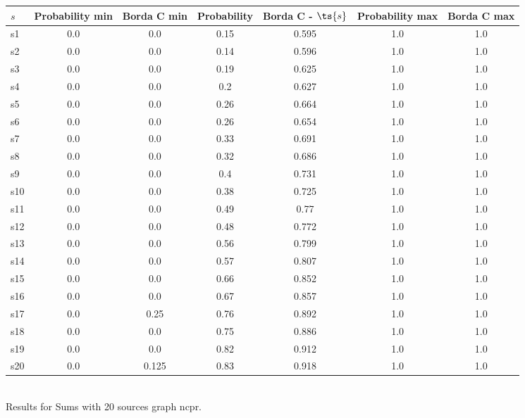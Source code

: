 \documentclass{article}
\begin{document}
\noindent\begin{tabular}{|l|c|c|c|c|c|c|}
\hline
$s$& Probability min & Borda C min & Probability & Borda C - $\ts{s}$ & Probability max & Borda C max\\
\hline
s1 &0.0 & 0.0 & 0.15 & 0.595 & 1.0 & 1.0\\
\hline
s2 &0.0 & 0.0 & 0.14 & 0.596 & 1.0 & 1.0\\
\hline
s3 &0.0 & 0.0 & 0.19 & 0.625 & 1.0 & 1.0\\
\hline
s4 &0.0 & 0.0 & 0.2 & 0.627 & 1.0 & 1.0\\
\hline
s5 &0.0 & 0.0 & 0.26 & 0.664 & 1.0 & 1.0\\
\hline
s6 &0.0 & 0.0 & 0.26 & 0.654 & 1.0 & 1.0\\
\hline
s7 &0.0 & 0.0 & 0.33 & 0.691 & 1.0 & 1.0\\
\hline
s8 &0.0 & 0.0 & 0.32 & 0.686 & 1.0 & 1.0\\
\hline
s9 &0.0 & 0.0 & 0.4 & 0.731 & 1.0 & 1.0\\
\hline
s10 &0.0 & 0.0 & 0.38 & 0.725 & 1.0 & 1.0\\
\hline
s11 &0.0 & 0.0 & 0.49 & 0.77 & 1.0 & 1.0\\
\hline
s12 &0.0 & 0.0 & 0.48 & 0.772 & 1.0 & 1.0\\
\hline
s13 &0.0 & 0.0 & 0.56 & 0.799 & 1.0 & 1.0\\
\hline
s14 &0.0 & 0.0 & 0.57 & 0.807 & 1.0 & 1.0\\
\hline
s15 &0.0 & 0.0 & 0.66 & 0.852 & 1.0 & 1.0\\
\hline
s16 &0.0 & 0.0 & 0.67 & 0.857 & 1.0 & 1.0\\
\hline
s17 &0.0 & 0.25 & 0.76 & 0.892 & 1.0 & 1.0\\
\hline
s18 &0.0 & 0.0 & 0.75 & 0.886 & 1.0 & 1.0\\
\hline
s19 &0.0 & 0.0 & 0.82 & 0.912 & 1.0 & 1.0\\
\hline
s20 &0.0 & 0.125 & 0.83 & 0.918 & 1.0 & 1.0\\
\hline
\end{tabular}\\

\noindent Results for Sums with 20 sources graph ncpr.
\end{document}
